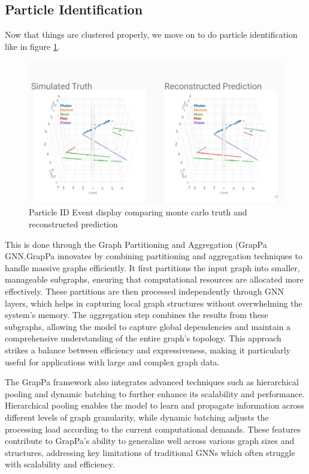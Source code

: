 \subsection{Particle Identification}

Now that things are clustered properly, we move on to do particle identification like in figure \ref{pidEvent}.

\begin{figure}[H]
  \centering
  \includegraphics[width=120mm]{figures/pidEvent.png}
  \caption{Particle ID Event display comparing monte carlo truth and reconstructed prediction}
  \label{pidEvent}
\end{figure}

This is done through the Graph Partitioning and Aggregation (GrapPa GNN.GrapPa innovates by combining partitioning and aggregation techniques to handle massive graphs efficiently.
It first partitions the input graph into smaller, manageable subgraphs, ensuring that computational resources are allocated more effectively.
These partitions are then processed independently through GNN layers, which helps in capturing local graph structures without overwhelming the system's memory.
The aggregation step combines the results from these subgraphs, allowing the model to capture global dependencies and maintain a comprehensive understanding of the entire graph's topology.
This approach strikes a balance between efficiency and expressiveness, making it particularly useful for applications with large and complex graph data.

The GrapPa framework also integrates advanced techniques such as hierarchical pooling and dynamic batching to further enhance its scalability and performance.
Hierarchical pooling enables the model to learn and propagate information across different levels of graph granularity, while dynamic batching adjusts the processing load according to the current computational demands.
These features contribute to GrapPa's ability to generalize well across various graph sizes and structures, addressing key limitations of traditional GNNs which often struggle with scalability and efficiency.

